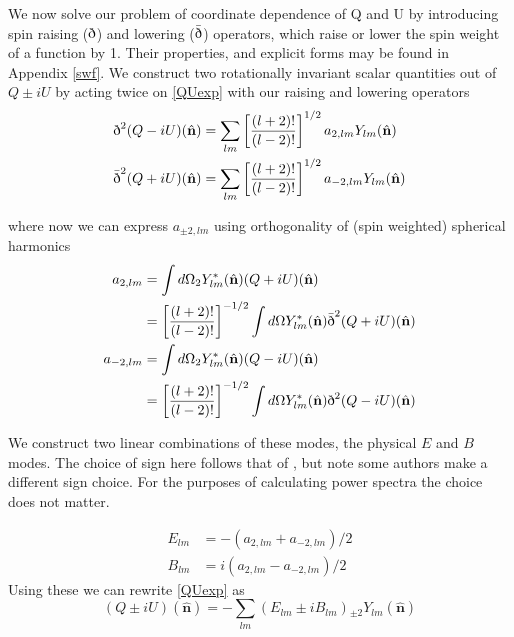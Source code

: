 \documentclass[a4paper,10pt]{article}
\renewcommand{\v}[1]{\mathbf{#1}}
\newcommand{\unit}[1]{\hat{\v{#1}}}
\newcommand{\sr}{\text{\normalfont\dh}}
\renewcommand{\sl}{\bar{\text{\normalfont\dh}}}
\newcommand{\ltwo}{\left[\frac{(l+2)!}{(l-2)!}\right]}
\begin{document}
We now solve our problem of coordinate dependence of Q and U by introducing spin raising ($\sr$) and lowering  ($\sl$) operators, which raise or lower the spin weight of a function by 1. Their properties, and explicit forms may be found in Appendix \ref{swf}. We construct two rotationally invariant scalar quantities out of $Q\pm iU$ by acting twice on \ref{QUexp} with our raising and lowering operators
\begin{equation}\begin{split}
\sr^2(Q-iU)(\unit{n}) &= \sum_{lm} \ltwo^{1/2} a_{2,lm} {}Y_{lm}(\unit{n})\\
\sl^2(Q+iU)(\unit{n}) &= \sum_{lm} \ltwo^{1/2} a_{-2,lm} {}Y_{lm}(\unit{n})
\end{split}\end{equation}

where now we can express $a_{\pm2,lm}$ using orthogonality of (spin weighted) spherical harmonics
\begin{equation}\begin{split}
a_{2,lm} &= \int d\Omega {}_2Y_{lm}^*(\unit{n})(Q+iU)(\unit{n})\\
&= \ltwo^{-1/2}\int d\Omega Y_{lm}^*(\unit{n})\sl^2(Q+iU)(\unit{n})\\
a_{-2,lm} &= \int d\Omega {}_2Y_{lm}^*(\unit{n})(Q-iU)(\unit{n})\\
&= \ltwo^{-1/2}\int d\Omega Y_{lm}^*(\unit{n})\sr^2(Q-iU)(\unit{n})
\end{split}\end{equation}

We construct two linear combinations of these modes, the physical $E$ and $B$ modes. The choice of sign here follows that of \cite{all-sky}, but note some authors make a different sign choice. For the purposes of calculating power spectra the choice does not matter.

\begin{equation}\begin{split} 
E_{lm} &= -(a_{2,lm} + a_{-2,lm})/2\\
B_{lm} &= i(a_{2,lm} - a_{-2,lm})/2
\end{split}\end{equation}
Using these we can rewrite \ref{QUexp} as 
\begin{equation}
(Q\pm iU)(\unit{n}) = -\sum_{lm} (E_{lm} \pm i B_{lm}) {}_{\pm2}Y_{lm}(\unit{n})
\label{QUEB}
\end{equation}
\end{document}
